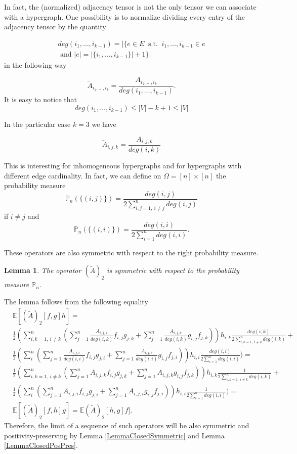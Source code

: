 \documentclass[11pt]{article}
\newtheorem{lemma}[theorem]{Lemma}
\begin{document}
In fact, the (normalized) adjacency tensor is not the only tensor we can associate with a hypergraph. One possibility is to normalize dividing  every entry of the adjacency tensor by the quantity 

$$
\begin{aligned}
deg(i_1,\ldots, i_{k-1})=|\{e\in E \ \text{ s.t. }\ i_1,\ldots, i_{k-1}\in e  \\
\text{ and } |e|=|\{i_1,\ldots, i_{k-1}\}|+1\}|
\end{aligned}
$$in the following way 


$$
\widetilde{A}_{i_1,\ldots, i_{k}}=\frac{A_{i_1,\ldots, i_{k}}}{deg(i_1,\ldots, i_{k-1})}.
$$
It is easy to notice that $$deg(i_1,\ldots, i_{k-1})\leq |V|-k+1\leq |V|$$

In the particular case $k=3$ we have

$$
\widetilde{A}_{i,j,k}=\frac{A_{i,j,k}}{deg(i,k)}
$$

This is interesting for inhomogeneous hypergraphs and for hypergraphs with different edge cardinality.
In fact, we can define on $\Omega=[n]\times [n]$ the probability measure $$\mathbb{P}_n(\{(i,j)\})=\frac{deg(i,j)}{2\sum^n_{i,j=1,\ i\neq j}deg(i,j)}$$ if $i\neq j$ and $$\mathbb{P}_n(\{(i,i)\})=\frac{deg(i,i)}{2\sum^n_{i=1}deg(i,i)}.$$


These operators are also symmetric with respect to the right probability measure.

\begin{lemma}
    The operator $(\widetilde{A})_2$  is symmetric with respect to the probability measure $\mathbb{P}_n$. 
\end{lemma}
\proof
The lemma follows from the following equality
$$\begin{aligned}
&\mathbb{E}[(\widetilde{A})_2[f,g]h]=\\
&\frac{1}{2}(\sum^n_{i,k=1, \ i\neq k}(\sum^n_{j=1}\frac{A_{i,j,k}}{deg(i,k)}f_{i,j}g_{j,k}+\sum^n_{j=1}\frac{A_{i,j,k}}{deg(i,k)}g_{i,j}f_{j,k}))h_{i,k}\frac{deg(i,k)}{2\sum^n_{i,k=1,\ i\neq k}deg(i,k)}+\\
& \frac{1}{2}(\sum^n_{i}(\sum^n_{j=1}\frac{A_{i,j,i}}{deg(i,i)}f_{i,j}g_{j,i}+\sum^n_{j=1}\frac{A_{i,j,i}}{deg(i,i)}g_{i,j}f_{j,i}))h_{i,i}\frac{deg(i,i)}{2\sum^n_{i=1}deg(i,i)})=\\&
\frac{1}{2}(\sum^n_{i,k=1, \ i\neq k}(\sum^n_{j=1}A_{i,j,k}f_{i,j}g_{j,k}+\sum^n_{j=1}A_{i,j,k}g_{i,j}f_{j,k}))h_{i,k}\frac{1}{2\sum^n_{i,k=1,\ i\neq k}deg(i,k)}+\\
& \frac{1}{2}(\sum^n_{i}(\sum^n_{j=1}A_{i,j,i}f_{i,j}g_{j,i}+\sum^n_{j=1}A_{i,j,i}g_{i,j}f_{j,i}))h_{i,i}\frac{1}{2\sum^n_{i=1}deg(i,i)})=\\&
\mathbb{E}[(\widetilde{A})_2[f,h]g]=\mathbb{E}(\widetilde{A})_2[h,g]f].
\end{aligned}
$$\endproof
Therefore, the limit of a sequence of such operators will be also symmetric and positivity-preserving by Lemma \ref{LemmaClosedSymmetric} and Lemma \ref{LemmaClosedPosPres}.
\end{document}
